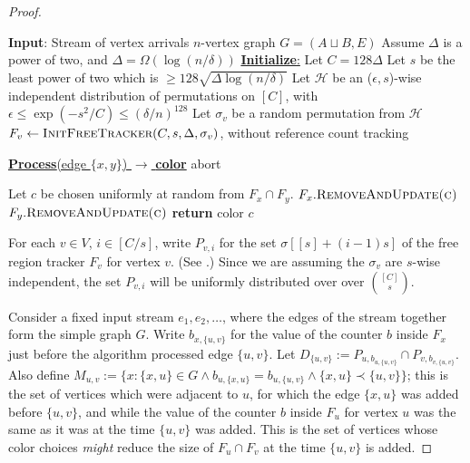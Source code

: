 \documentclass[10pt]{article}
\theoremstyle{definition}\newtheorem{definition}[lemma]{Definition}
\theoremstyle{remark}  \newtheorem*{remark}{Remark}
\newcommand{\cH}{\mathcal{H}}
\begin{document}
\begin{proof}
  
  \begin{algorithm}[htb!]
    \caption{Randomized algorithm for $O(\Delta)$ edge coloring for simple graph edge arrival streams\label{alg:rand-ea-edgecol}}
    \begin{algorithmic}[1]
    \Statex \textbf{Input}: Stream of vertex arrivals $n$-vertex graph $G=(A \sqcup B, E)$
    \Statex Assume $\Delta$ is a power of two, and $\Delta = \Omega(\log(n/\delta))$
      \Statex
      \Statex \underline{\textbf{Initialize}:}
      \State Let $C = 128 \Delta$
      \State Let $s$ be the least power of two which is $\ge 128 \sqrt{\Delta \log (n/\delta)}$
      \State Let $\cH$ be an ($\epsilon,s$)-wise independent distribution of permutations on $[C]$, with $\epsilon \le \exp(-s^2/C) \le (\delta/n)^{128}$
        \State Let $\sigma_v$ be a random permutation from $\cH$
        \State $F_v \gets \textsc{InitFreeTracker}(C, s, \Delta, \sigma_v)$, without reference count tracking
      \EndFor
    \Statex 
      
    \Statex 
    \Statex\underline{\textbf{Process}(edge $\{x,y\}$) $\rightarrow$ \textbf{color}}
        \State abort
      \EndIf
      
      \State Let $c$ be chosen uniformly at random from $F_x \cap F_y$.\label{step:rand-ea-edgecol-pick-color}
      \State $F_x.\textsc{RemoveAndUpdate(c)}$
      \State $F_y.\textsc{RemoveAndUpdate(c)}$
      \State \textbf{return} color $c$
    \end{algorithmic}
  \end{algorithm}
  
  For each $v \in V$, $i \in [C/s]$, write $P_{v,i}$ for the set $\sigma[[s] + (i -1) s]$ of the free region tracker $F_v$ for vertex $v$. (See .) Since we are assuming the $\sigma_v$ are $s$-wise independent, the set $P_{v,i}$ will be uniformly distributed over over $\binom{[C]}{s}$.
  
  Consider a fixed input stream $e_1,e_2,\ldots$, where the edges of the stream together form the simple graph $G$. Write $b_{x,\{u,v\}}$ for the value of the counter $b$ inside $F_x$ just before the algorithm processed edge $\{u,v\}$. Let $D_{\{u,v\}} := P_{u, b_{u,\{u,v\}}} \cap P_{v, b_{v,\{u,v\}}}$. Also define $M_{u,v} := \{ x : \{x,u\} \in G \land b_{u,\{x,u\}} = b_{u,\{u,v\}} \land \{x,u\} \prec \{u,v\}\}$; this is the set of vertices which were adjacent to $u$, for which the edge $\{x,u\}$ was added before $\{u,v\}$, and while the value of the counter $b$ inside $F_u$ for vertex $u$ was the same as it was at the time $\{u,v\}$ was added. This is the set of vertices whose color
  choices \emph{might} reduce the size of $F_u \cap F_v$ at the time $\{u,v\}$ is added. 
  

\end{proof}
\end{document}
